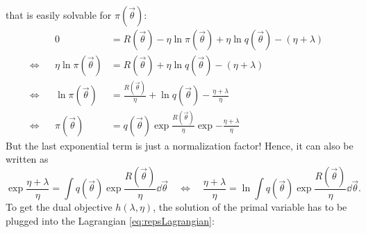 				that is easily solvable for \( \pi(\vec{\theta}) \):
				\begin{align*}
					                           &                                                                                              &
					0                          & = R(\vec{\theta}) - \eta \ln \pi(\vec{\theta}) + \eta \ln q(\vec{\theta}) - (\eta + \lambda) & \\
					\iff                       &                                                                                              &
					\eta \ln \pi(\vec{\theta}) & = R(\vec{\theta}) + \eta \ln q(\vec{\theta}) - (\eta + \lambda)                              & \\
					\iff                       &                                                                                              &
					\ln \pi(\vec{\theta})      & = \frac{R(\vec{\theta})}{\eta} + \ln q(\vec{\theta}) - \frac{\eta + \lambda}{\eta}           & \\
					\iff                       &                                                                                              &
					\pi(\vec{\theta})          & = q(\vec{\theta}) \exp{\frac{R(\vec{\theta})}{\eta}} \exp{-\frac{\eta + \lambda}{\eta}}      &
				\end{align*}
				But the last exponential term is just a normalization factor! Hence, it can also be written as
				\begin{equation*}
					\exp{\frac{\eta + \lambda}{\eta}} = \int\! q(\vec{\theta}) \exp{\frac{R(\vec{\theta})}{\eta}} \dd{\vec{\theta}}
					\quad\iff\quad
					\frac{\eta + \lambda}{\eta} = \ln \int\! q(\vec{\theta}) \exp{\frac{R(\vec{\theta})}{\eta}} \dd{\vec{\theta}}.
				\end{equation*}
				To get the dual objective \( h(\lambda, \eta) \), the solution of the primal variable has to be plugged into the Lagrangian \eqref{eq:repsLagrangian}:

